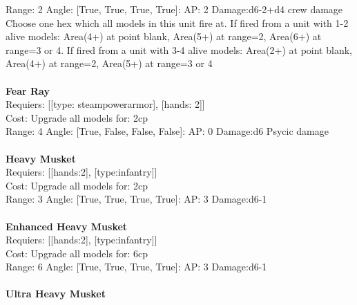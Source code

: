 Range: 2  Angle: [True, True, True, True]: AP: 2 Damage:d6-2+d4 crew damage \\
Choose one hex which all models in this unit fire at. If fired from a unit with 1-2 alive models: Area(4+) at point blank, Area(5+) at range=2, Area(6+) at range=3 or 4. If fired from a unit with 3-4 alive models: Area(2+) at point blank, Area(4+) at range=2, Area(5+) at range=3 or 4\\ 








\ \\
{\bf Fear Ray } \\

Requiers: [[type: steampowerarmor], [hands: 2]] \\
Cost: Upgrade all models for: 2cp \\


Range: 4  Angle: [True, False, False, False]: AP: 0 Damage:d6 Psycic damage \\








\ \\
{\bf Heavy Musket } \\

Requiers: [[hands:2], [type:infantry]] \\
Cost: Upgrade all models for: 2cp \\


Range: 3  Angle: [True, True, True, True]: AP: 3 Damage:d6-1 \\








\ \\
{\bf Enhanced Heavy Musket } \\

Requiers: [[hands:2], [type:infantry]] \\
Cost: Upgrade all models for: 6cp \\


Range: 6  Angle: [True, True, True, True]: AP: 3 Damage:d6-1 \\








\ \\
{\bf Ultra Heavy Musket } \\

